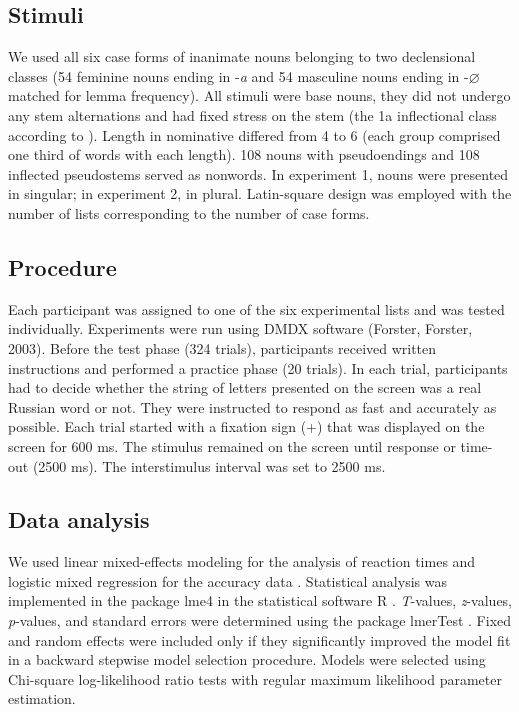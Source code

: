 \documentclass[output=paper, modfonts,newtxmath,hidelinks]{langscibook}
\begin{document}
\subsection{Stimuli} We used all six case forms of inanimate nouns belonging to two declensional classes (54 feminine nouns ending in -\textit{a} and 54 masculine nouns ending in -\textit{$\varnothing$} matched for lemma frequency). All stimuli were base nouns, they did not undergo any stem alternations and had fixed stress on the stem (the 1a inflectional class according to \citealt{zaliznyak1977grammatical}). Length in nominative differed from 4 to 6 (each group comprised one third of words with each length). 108 nouns with pseudoendings and 108 inflected pseudostems served as nonwords. In experiment 1, nouns were presented in singular; in experiment 2, in plural. Latin-square design was employed with the number of lists corresponding to the number of case forms.

\subsection{Procedure} Each participant was assigned to one of the six experimental lists and was tested individually. Experiments were run using DMDX software (Forster, Forster, 2003). Before the test phase (324 trials), participants received written instructions and performed a practice phase (20 trials). In each trial, participants had to decide whether the string of letters presented on the screen was a real Russian word or not. They were instructed to respond as fast and accurately as possible. Each trial started with a fixation sign (+) that was displayed on the screen for 600 ms. The stimulus remained on the screen until response or time-out (2500 ms). The interstimulus interval was set to 2500 ms.

\subsection{Data analysis} We used linear mixed-effects modeling for the analysis of reaction times and logistic mixed regression for the accuracy data  \citep{baayen2008analyzing}. Statistical analysis was implemented in the package lme4  \citep{bates2014lme4} in the statistical software R \citep{team2014r}. \textit{T}-values, \textit{z}-values, \textit{p}-values, and standard errors were determined using the package lmerTest \citep{kuznetsova2015package}. Fixed and random effects were included only if they significantly improved the model fit in a backward stepwise model selection procedure. Models were selected using Chi-square log-likelihood ratio tests with regular maximum likelihood parameter estimation. 
\end{document}
